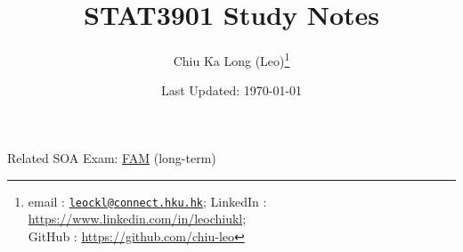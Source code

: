 \documentclass{article}
\begin{document}
\title{STAT3901 Study Notes}
\author{Chiu Ka Long (Leo)\thanks{
email :
\href{mailto:leockl@connect.hku.hk}{\texttt{leockl@connect.hku.hk}};
LinkedIn :
\url{https://www.linkedin.com/in/leochiukl}; \\
GitHub :
\url{https://github.com/chiu-leo}
}}
\date{Last Updated: \today}
\maketitle
\doclicenseThis
\begin{note}
Related SOA Exam:
\href{https://www.soa.org/education/exam-req/edu-exam-fam/}{FAM} (long-term)
\end{note}
\tableofcontents






\printbibliography

\end{document}
